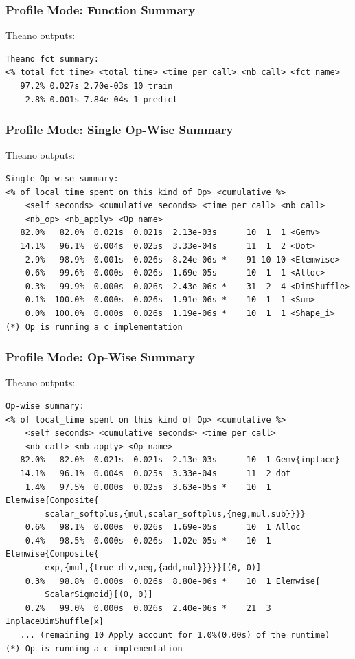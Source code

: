 \documentclass[a4paper,9pt]{beamer}
\begin{document}
\begin{frame}[fragile]
\frametitle{Profile Mode: Function Summary}
Theano outputs:
\vfill
\begin{Verbatim}
Theano fct summary:
<% total fct time> <total time> <time per call> <nb call> <fct name>
   97.2% 0.027s 2.70e-03s 10 train
    2.8% 0.001s 7.84e-04s 1 predict
\end{Verbatim}
\end{frame}

\begin{frame}[fragile]
\frametitle{Profile Mode: Single Op-Wise Summary}
Theano outputs:
\vfill
\begin{Verbatim}
Single Op-wise summary:
<% of local_time spent on this kind of Op> <cumulative %> 
    <self seconds> <cumulative seconds> <time per call> <nb_call>
    <nb_op> <nb_apply> <Op name>
   82.0%   82.0%  0.021s  0.021s  2.13e-03s      10  1  1 <Gemv>
   14.1%   96.1%  0.004s  0.025s  3.33e-04s      11  1  2 <Dot>
    2.9%   98.9%  0.001s  0.026s  8.24e-06s *    91 10 10 <Elemwise>
    0.6%   99.6%  0.000s  0.026s  1.69e-05s      10  1  1 <Alloc>
    0.3%   99.9%  0.000s  0.026s  2.43e-06s *    31  2  4 <DimShuffle>
    0.1%  100.0%  0.000s  0.026s  1.91e-06s *    10  1  1 <Sum>
    0.0%  100.0%  0.000s  0.026s  1.19e-06s *    10  1  1 <Shape_i>
(*) Op is running a c implementation
\end{Verbatim}
\end{frame}

\begin{frame}[fragile]
\frametitle{Profile Mode: Op-Wise Summary}
Theano outputs:
\vfill
\begin{Verbatim}
Op-wise summary:
<% of local_time spent on this kind of Op> <cumulative %>
    <self seconds> <cumulative seconds> <time per call>
    <nb_call> <nb apply> <Op name>
   82.0%   82.0%  0.021s  0.021s  2.13e-03s      10  1 Gemv{inplace}
   14.1%   96.1%  0.004s  0.025s  3.33e-04s      11  2 dot
    1.4%   97.5%  0.000s  0.025s  3.63e-05s *    10  1 Elemwise{Composite{
        scalar_softplus,{mul,scalar_softplus,{neg,mul,sub}}}}
    0.6%   98.1%  0.000s  0.026s  1.69e-05s      10  1 Alloc
    0.4%   98.5%  0.000s  0.026s  1.02e-05s *    10  1 Elemwise{Composite{
        exp,{mul,{true_div,neg,{add,mul}}}}}[(0, 0)]
    0.3%   98.8%  0.000s  0.026s  8.80e-06s *    10  1 Elemwise{
        ScalarSigmoid}[(0, 0)]
    0.2%   99.0%  0.000s  0.026s  2.40e-06s *    21  3 InplaceDimShuffle{x}
   ... (remaining 10 Apply account for 1.0%(0.00s) of the runtime)
(*) Op is running a c implementation
\end{Verbatim}
\end{frame}
\end{document}
